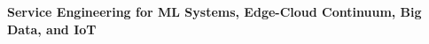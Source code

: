 \documentclass[landscape,a0,final]{a0poster} %
\begin{document}
\thispagestyle{empty} %




\begin{minipage}[t]{0.98\linewidth} %
\vspace{0pt} %

\vspace{0.008\linewidth} %

\begin{minipage}[t]{0.09\linewidth} %
\vspace{0pt} %




\end{minipage} %
\begin{minipage}[t]{0.72\linewidth} %
\vspace{0pt} %





{\renewcommand{\baselinestretch}{0.85} %
\Huge{\bfseries{\textsf{Service Engineering for ML Systems, Edge-Cloud Continuum, Big Data, and IoT}}} %
\par} %
\vspace{0.01\linewidth} %


\end{minipage}
\end{minipage}
\end{document}
